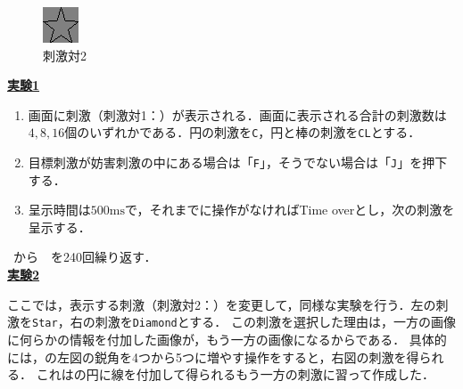 \begin{figure}
\begin{minipage}[t]{.13\textwidth}
        \includegraphics[keepaspectratio,width=\textwidth]{../../13_BehavioralExperiment/star.png}
    \end{minipage}
    \caption{刺激対2}
    \label{fig:刺激対2}
    \vspace{-1cm}
\end{figure}
\noindent\textbf{\underline{実験1}}
\begin{enumerate}
    \renewcommand{\labelenumi}{\fbox{\theenumi}}
    \item 画面に刺激（刺激対1：）が表示される．画面に表示される合計の刺激数は\(4,8,16\)個のいずれかである．円の刺激を\texttt{C}，円と棒の刺激を\texttt{CL}とする．
    \item 目標刺激が妨害刺激の中にある場合は「\texttt{F}」，そうでない場合は「\texttt{J}」を押下する．
    \item 呈示時間は\(500\textrm{ms}\)で，それまでに操作がなければTime overとし，次の刺激を呈示する．
\end{enumerate}
\ から\ \ を240回繰り返す．\\
\textbf{\underline{実験2}}\par
ここでは，表示する刺激（刺激対2：）を変更して，同様な実験を行う．左の刺激を\texttt{Star}，右の刺激を\texttt{Diamond}とする．
この刺激を選択した理由は，一方の画像に何らかの情報を付加した画像が，もう一方の画像になるからである．
具体的には，の左図の鋭角を4つから5つに増やす操作をすると，右図の刺激を得られる．
これはの円に線を付加して得られるもう一方の刺激に習って作成した．
